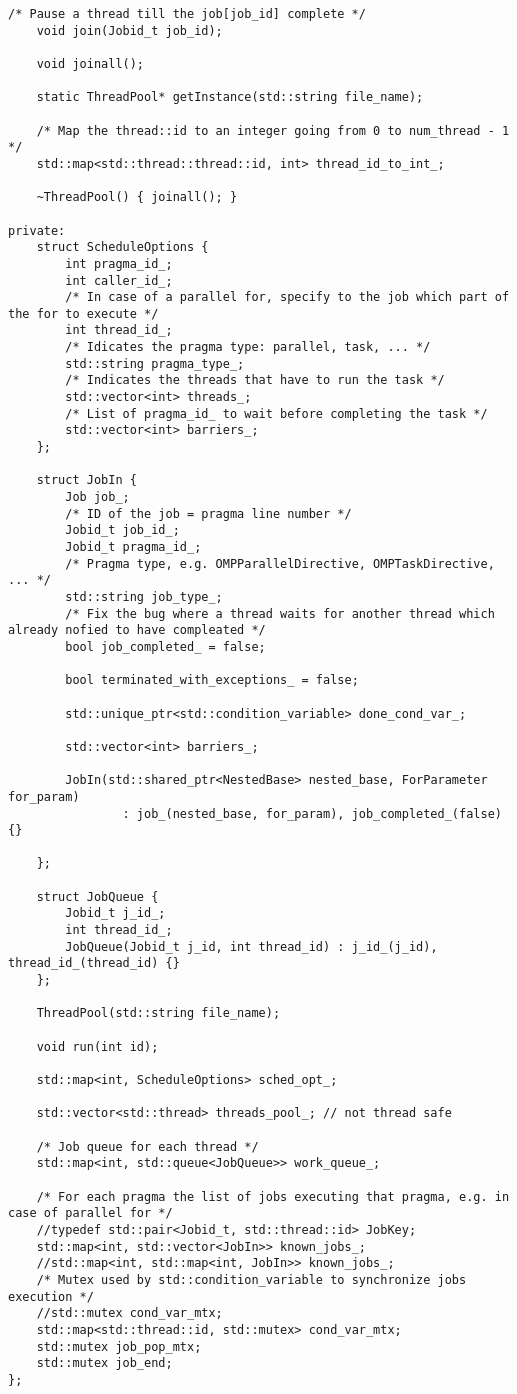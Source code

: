 \documentclass[a4paper,10pt,twoside]{book}
\begin{document}
\begin{lstlisting}[language=CCC, caption=thread\_pool.h]
    /* Pause a thread till the job[job_id] complete */
    void join(Jobid_t job_id);

    void joinall();

    static ThreadPool* getInstance(std::string file_name);

    /* Map the thread::id to an integer going from 0 to num_thread - 1 */
    std::map<std::thread::thread::id, int> thread_id_to_int_;

    ~ThreadPool() { joinall(); }

private:
    struct ScheduleOptions {
        int pragma_id_;
        int caller_id_;
        /* In case of a parallel for, specify to the job which part of the for to execute */
        int thread_id_;
        /* Idicates the pragma type: parallel, task, ... */
        std::string pragma_type_;
        /* Indicates the threads that have to run the task */
        std::vector<int> threads_;
        /* List of pragma_id_ to wait before completing the task */
        std::vector<int> barriers_;
    };

    struct JobIn {
        Job job_;
        /* ID of the job = pragma line number */
        Jobid_t job_id_;
        Jobid_t pragma_id_;
        /* Pragma type, e.g. OMPParallelDirective, OMPTaskDirective, ... */
        std::string job_type_;
        /* Fix the bug where a thread waits for another thread which already nofied to have compleated */
        bool job_completed_ = false;

        bool terminated_with_exceptions_ = false;

        std::unique_ptr<std::condition_variable> done_cond_var_;

        std::vector<int> barriers_;

        JobIn(std::shared_ptr<NestedBase> nested_base, ForParameter for_param)
                : job_(nested_base, for_param), job_completed_(false) {}

    };

    struct JobQueue {
        Jobid_t j_id_;
        int thread_id_;
        JobQueue(Jobid_t j_id, int thread_id) : j_id_(j_id), thread_id_(thread_id) {}
    };

    ThreadPool(std::string file_name);
    
    void run(int id);

    std::map<int, ScheduleOptions> sched_opt_;

    std::vector<std::thread> threads_pool_; // not thread safe
    
    /* Job queue for each thread */
    std::map<int, std::queue<JobQueue>> work_queue_;
    
    /* For each pragma the list of jobs executing that pragma, e.g. in case of parallel for */
    //typedef std::pair<Jobid_t, std::thread::id> JobKey;
    std::map<int, std::vector<JobIn>> known_jobs_;
    //std::map<int, std::map<int, JobIn>> known_jobs_;
    /* Mutex used by std::condition_variable to synchronize jobs execution */
    //std::mutex cond_var_mtx;
    std::map<std::thread::id, std::mutex> cond_var_mtx;
    std::mutex job_pop_mtx;
    std::mutex job_end;
};

\end{lstlisting}
\end{document}

